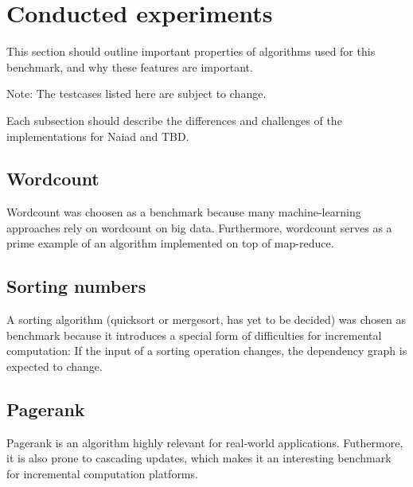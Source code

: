 \section{Conducted experiments}
This section should outline important properties of algorithms used for this benchmark, and why these features are important. 

Note: The testcases listed here are subject to change. 

Each subsection should describe the differences and challenges of the implementations for Naiad and TBD. 

\subsection{Wordcount}
Wordcount was choosen as a benchmark because many machine-learning approaches rely on wordcount on big data. Furthermore, wordcount serves as a prime example of an algorithm implemented on top of map-reduce. 

\subsection{Sorting numbers}
A sorting algorithm (quicksort or mergesort, has yet to be decided) was chosen as benchmark because it introduces a special form of difficulties for incremental computation: If the input of a sorting operation changes, the dependency graph is expected to change.

\subsection{Pagerank}
Pagerank is an algorithm highly relevant for real-world applications. Futhermore, it is also prone to cascading updates, which makes it an interesting benchmark for incremental computation platforms. 